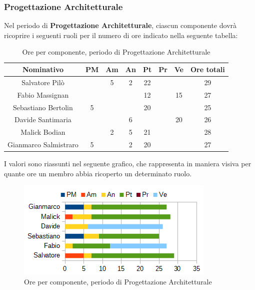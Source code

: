 		\subsubsection{Progettazione Architetturale}
		Nel periodo di \textbf{Progettazione Architetturale}, ciascun componente dovrà ricoprire i seguenti ruoli per il numero di ore indicato nella seguente tabella: \\
		\begin{table}[H]
		\centering
		\begin{tabular}{|c|c|c|c|c|c|c|c|}
			\hline
			\textbf{Nominativo}		& \textbf{PM}	& \textbf{Am}	& \textbf{An}	& \textbf{Pt}	& \textbf{Pr}	& \textbf{Ve}	& \textbf{Ore totali}     \\
			\hline
			Salvatore Pilò			& 		& 5 	& 2		& 22	&		&		& 29 \\
			Fabio Massignan			&		& 		& 		& 12	&		& 15	& 27 \\
			Sebastiano Bertolin		& 5		& 		&  		& 20	&		&		& 25 \\
			Davide Santimaria		&		& 		& 6		&		&		& 20	& 26 \\
			Malick Bodian			& 		& 2		& 5		& 21	&		& 		& 28 \\
			Gianmarco Salmistraro	& 5		& 		& 2		& 20	&		& 		& 27 \\
			\hline
		\end{tabular}
		\caption{Ore per componente, periodo di Progettazione Architetturale}
		\end{table}
		I valori sono riassunti nel seguente grafico, che rappresenta in maniera visiva per quante ore un membro abbia ricoperto un determinato ruolo. \\
		\begin{figure}[H]
			\centering
			\includegraphics[width=1\linewidth]{immagini/grafici/progettazione_architetturale-barra.png}
			\caption{Ore per componente, periodo di Progettazione Architetturale}
		\end{figure}

